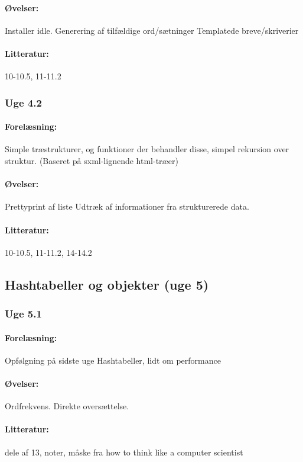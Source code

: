 \documentclass[12pt]{article}
\begin{document}
\paragraph{Øvelser:}
Installer idle.
Generering af tilfældige ord/sætninger
Templatede breve/skriverier
\paragraph{Litteratur:} 10-10.5, 11-11.2

\subsubsection{Uge 4.2}
\paragraph{Forelæsning:} 
Simple træstrukturer, og funktioner der behandler disse, simpel rekursion over struktur. (Baseret på sxml-lignende html-træer)
\paragraph{Øvelser:}
Prettyprint af liste
Udtræk af informationer fra strukturerede data.
\paragraph{Litteratur:} 10-10.5, 11-11.2, 14-14.2

\subsection{Hashtabeller og objekter (uge 5)}
\subsubsection{Uge 5.1}
\paragraph{Forelæsning:} 
Opfølgning på sidste uge
Hashtabeller, lidt om performance
\paragraph{Øvelser:}
Ordfrekvens.
Direkte oversættelse.
\paragraph{Litteratur:} dele af 13, noter, måske fra how to think like a computer scientist
\end{document}
